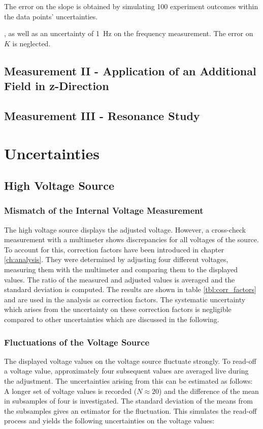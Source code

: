 \documentclass[
	paper=A4,
	parskip=full,
	chapterprefix=true,
	11pt,
	headings=normal,
	bibliography=totoc,
	listof=totoc,
	titlepage=on,
]{scrreprt}
\begin{document}
The error on the slope is obtained by simulating \num{100} experiment outcomes within the data points' uncertainties.




, as well as an uncertainty of \SI{1}{\hertz} on the frequency measurement. The error on $K$ is neglected.


\section{Measurement II - Application of an Additional Field in z-Direction}
\section{Measurement III - Resonance Study}

\chapter{Uncertainties}
\label{ch:systematics}
\section{High Voltage Source}
\subsection{Mismatch of the Internal Voltage Measurement}
The high voltage source displays the adjusted voltage. However, a cross-check measurement with a multimeter shows discrepancies for all voltages of the source. To account for this, correction factors have been introduced in chapter \ref{ch:analysis}. They were determined by adjusting four different voltages, measuring them with the multimeter and comparing them to the displayed values. The ratio of the measured and adjusted values is averaged and the standard deviation is computed. The results are shown in table \ref{tbl:corr_factors} and are used in the analysis as correction factors. The systematic uncertainty which arises from the uncertainty on these correction factors is negligible compared to other uncertainties which are discussed in the following.

\subsection{Fluctuations of the Voltage Source}
The displayed voltage values on the voltage source fluctuate strongly. To read-off a voltage value, approximately four subsequent values are averaged live during the adjustment. The uncertainties arising from this can be estimated as follows: A longer set of voltage values is recorded ($N\approx20$) and the difference of the mean in subsamples of four is investigated. The standard deviation of the means from the subsamples gives an estimator for the fluctuation. This simulates the read-off process and yields the following uncertainties on the voltage values:
\end{document}
